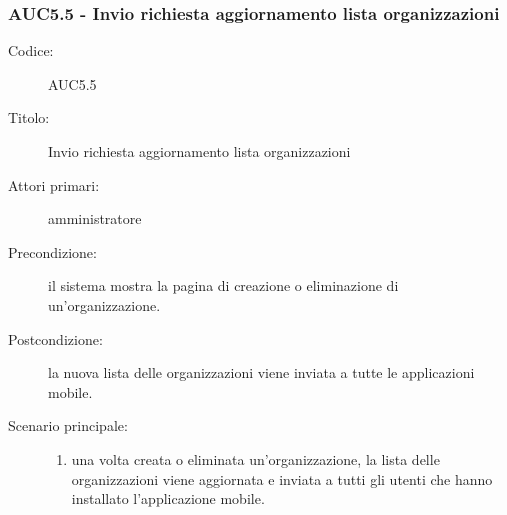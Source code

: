 \documentclass[../../../analisi-dei-requisiti.tex]{subfiles}
\begin{document}
\subsubsection{AUC5.5 - Invio richiesta aggiornamento lista organizzazioni}%
\label{subs:AUC5.5}
\begin{description}
  \item[Codice:] AUC5.5
  \item[Titolo:] Invio richiesta aggiornamento lista organizzazioni
  \item[Attori primari:] amministratore
  \item[Precondizione:] il sistema mostra la pagina di creazione o eliminazione di un'organizzazione.
  \item[Postcondizione:] la nuova lista delle organizzazioni viene inviata a tutte le applicazioni mobile.
  \item[Scenario principale:]
  \begin{enumerate}
    \item una volta creata o eliminata un'organizzazione, la lista delle organizzazioni viene aggiornata e inviata a tutti gli utenti che hanno installato l'applicazione mobile.
  \end{enumerate}
\end{description}
\end{document}
